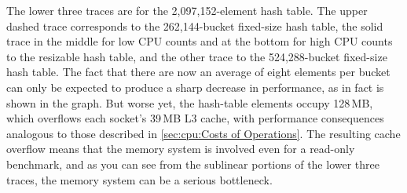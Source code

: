 The lower three traces are for the 2,097,152-element hash table.
The upper dashed trace corresponds to the 262,144-bucket fixed-size
hash table, the solid trace in the middle for low CPU counts and at
the bottom for high CPU counts to the resizable hash table,
and the other trace to the 524,288-bucket fixed-size hash table.
The fact that there are now an average of eight elements per bucket
can only be expected to produce a sharp decrease in performance,
as in fact is shown in the graph.
But worse yet, the hash-table elements occupy 128\,MB, which overflows
each socket's 39\,MB L3 cache, with performance consequences analogous
to those described in \cref{sec:cpu:Costs of Operations}.
The resulting cache overflow means that the memory system is involved
even for a read-only benchmark, and as you can see from the sublinear
portions of the lower three traces, the memory system can be a serious
bottleneck.

